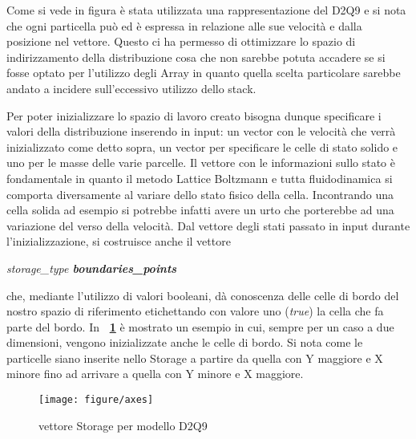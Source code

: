 {Come si vede in figura \`e stata utilizzata una rappresentazione del D2Q9 e si nota che  ogni particella pu\`o ed \`e espressa in relazione alle sue velocit\`a e dalla posizione nel vettore. Questo ci ha permesso di ottimizzare lo spazio di indirizzamento della distribuzione cosa che non sarebbe potuta accadere se si fosse optato per l'utilizzo degli Array in quanto quella scelta particolare sarebbe andato a incidere sull'eccessivo utilizzo dello stack.

Per poter inizializzare lo spazio di lavoro creato bisogna dunque specificare i valori della distribuzione inserendo in input: un vector con le velocit\`a che verr\`a inizializzato come detto sopra, un vector per specificare le celle di stato solido e uno per le masse delle varie parcelle. Il vettore con le informazioni sullo stato \`e fondamentale in quanto il metodo Lattice Boltzmann e tutta fluidodinamica si comporta diversamente al variare dello stato fisico della cella. Incontrando una cella solida ad esempio si potrebbe infatti avere un urto che porterebbe ad una variazione del verso della velocit\`a. Dal vettore degli stati passato in input durante l'inizializzazione, si costruisce anche il vettore 
\begin{center}
	\textit{storage\_type \textbf{boundaries\_points}}\\
\end{center}
che, mediante l'utilizzo di valori booleani, d\`a conoscenza delle celle di bordo del nostro spazio di riferimento etichettando con valore uno (\textit{true}) la cella che fa parte del bordo. 
In \textbf{\figurename~\ref{fig:axes}} \`e mostrato un esempio in cui, sempre per un caso a due dimensioni, vengono inizializzate anche le celle di bordo. Si nota come le particelle siano inserite nello Storage a partire da quella con Y maggiore e X minore fino ad arrivare a quella con Y minore e X maggiore.
\begin{figure}[!htb]
	\begin{center}
		\texttt{[image: figure/axes]}
	\end{center}
	\caption{vettore Storage per modello D2Q9 \label{fig:axes}}
\end{figure}\hfill

}
